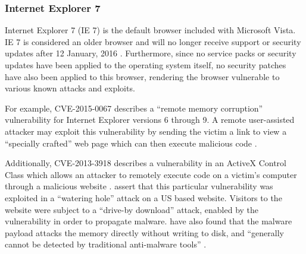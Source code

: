 
\subsubsection{Internet Explorer 7}

Internet Explorer 7 (IE 7) is the default browser included with Microsoft Vista. IE 7 is considered an older browser and will no longer receive support or security updates after 12 January, 2016 \citep{Capriotti2014}. Furthermore, since no service packs or security updates have been applied to the operating system itself, no security patches have also been applied to this browser, rendering the browser vulnerable to various known attacks and exploits.

For example, CVE-2015-0067 describes a ``remote memory corruption'' vulnerability for Internet Explorer versions 6 through 9. A remote user-assisted attacker may exploit this vulnerability by sending the victim a link to view a ``specially crafted'' web page which can then execute malicious code \citep{SecurityFocus2015}.

Additionally, CVE-2013-3918 describes a vulnerability in an ActiveX Control Class which allows an attacker to remotely execute code on a victim's computer through a malicious website \citep{Ozkan2013, Microsoft2013}. \citet{Chen2013} assert that this particular vulnerability was exploited in a ``watering hole'' attack on a US based website. Visitors to the website were subject to a ``drive-by download'' attack, enabled by the vulnerability in order to propagate malware. \citet{Moran2013} have also found that the malware payload attacks the memory directly without writing to disk, and ``generally cannot be detected by traditional anti-malware tools'' \citep{Wilson2013}.


